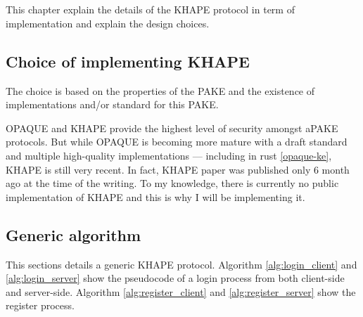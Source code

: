 \documentclass[../report.tex]{subfiles}
\begin{document}
\chapter{}

This chapter explain the details of the KHAPE protocol in term of implementation and explain the design choices.

\section{Choice of implementing KHAPE}

The choice is based on the properties of the PAKE and the existence of implementations and/or standard for this PAKE.

OPAQUE and KHAPE provide the highest level of security amongst aPAKE protocols.
But while OPAQUE is becoming more mature with a draft standard and multiple high-quality implementations --- including in rust \ref{opaque-ke}, KHAPE is still very recent.
In fact, KHAPE paper was published only 6 month ago at the time of the writing. To my knowledge, there is currently no public implementation of KHAPE and this is why I will be implementing it.

\section{Generic algorithm}
This sections details a generic KHAPE protocol.
Algorithm \ref{alg:login_client} and \ref{alg:login_server} show the pseudocode of a login process from both client-side and server-side. Algorithm \ref{alg:register_client} and \ref{alg:register_server} show the register process.
\end{document}
